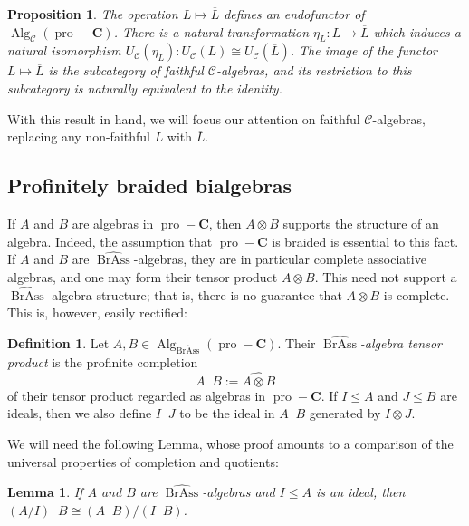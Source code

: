 \documentclass[12pt]{article}
\DeclareMathOperator{\Alg}{Alg}
\DeclareMathOperator{\pro}{pro}
\DeclareMathOperator{\BrAss}{BrAss}
\DeclareMathOperator{\hattimes}{\widehat{\otimes}}
\newcommand{\BrAsshat}{\widehat{\BrAss}} %
\newcommand{\Lbar}{\overline{L}}
\newcommand{\CC} {\mathcal{C}}
\newcommand{\bC} {\mathbf{C}}
\newcommand{\proC}{\pro\!-\bC}
\theoremstyle{plain}
\newtheorem{prop}[thm]{Proposition}
\newtheorem{lem}[thm]{Lemma}
\theoremstyle{definition}
\newtheorem{defn}[thm]{Definition}
\theoremstyle{remark}
\begin{document}
\begin{prop}

The operation $L \mapsto \Lbar$ defines an endofunctor of $\Alg_{\CC}(\proC)$.  There is a natural transformation $\eta_L: L \to \Lbar$ which induces a natural isomorphism $U_{\CC}(\eta_L): U_{\CC}(L) \cong U_{\CC}(\Lbar)$.  The image of the functor $L \mapsto \Lbar$ is the subcategory of faithful $\CC$-algebras, and its restriction to this subcategory is naturally equivalent to the identity.

\end{prop}

With this result in hand, we will focus our attention on faithful $\CC$-algebras, replacing any non-faithful $L$ with $\Lbar$.



\subsection{Profinitely braided bialgebras}

If $A$ and $B$ are algebras in $\proC$, then $A \otimes B$ supports the structure of an algebra.  Indeed, the assumption that $\proC$ is braided is essential to this fact.  If $A$ and $B$ are $\BrAsshat$-algebras, they are in particular complete associative algebras, and one may form their tensor product $A \otimes B$.  This need not support a $\BrAsshat$-algebra structure; that is, there is no guarantee that $A \otimes B$ is complete.  This is, however, easily rectified:

\begin{defn}

Let $A, B \in \Alg_{\BrAsshat}(\proC)$.  Their \emph{$\BrAsshat$-algebra tensor product} is the profinite completion
%
$$A \hattimes B := \widehat{A \otimes B}$$
%
of their tensor product regarded as algebras in $\proC$. If $I \leq A$ and $J \leq B$ are ideals, then we also define $I \hattimes J$ to be the ideal in $A \hattimes B$ generated by $I \otimes J$.

\end{defn}

We will need the following Lemma, whose proof amounts to a comparison of the universal properties of completion and quotients:

\begin{lem}

If $A$ and $B$ are $\BrAsshat$-algebras and $I \leq A$ is an ideal, then $(A/I) \hattimes B \cong (A \hattimes B)/(I \hattimes B)$.

\end{lem}
\end{document}
